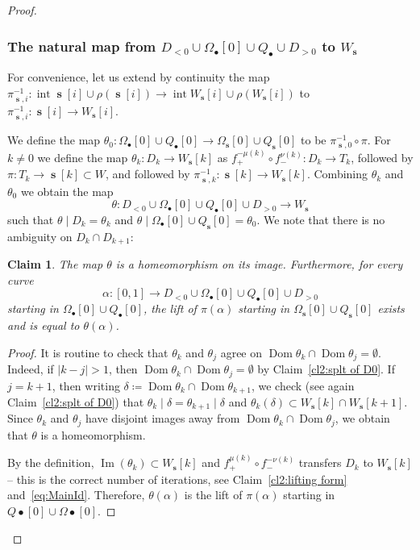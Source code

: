 \documentclass[]{amsart}
\newcommand{\Dom}{\operatorname {Dom}}
\renewcommand{\Im}{\operatorname {Im}}
\newcommand\intr{\operatorname{int}}
\newcommand\seq{{\operatorname{\mathbf s}}}
\newcommand\oseq{{\bullet}}
\newcommand\wall{{Q}}
\newcommand\inn{{\Omega}}
\newtheorem{claim2}{Claim}
\theoremstyle{remark}
\numberwithin{equation}{section}
\theoremstyle{definition}
\begin{document}
\begin{proof}
\subsubsection{The natural map from $D_{<0}\cup \inn_{\oseq }[0]\cup \wall_{\oseq }  \cup D_{>0}$ to $W_\seq$}For convenience, let us extend by continuity the map $\pi^{-1}_{\seq,i}\colon \intr \seq[i]\cup \rho(\seq[i]) \to \intr W_{\seq}[i] \cup \rho(W_\seq[i])$ to $\pi^{-1}_{\seq,i}\colon  \seq[i] \to  W_{\seq}[i]$.  

We define the map $\theta_0\colon \inn_{\oseq }[0]\cup \wall_{\oseq }[0]\to \inn_\seq[0]\cup \wall_\seq[0]$ to be $\pi^{-1}_{\seq,0}\circ \pi$. For $k\not=0$ we define the map $\theta_k\colon D_k\to W_\seq[k]$ as $ f_{+}^ {-\mu(k)}\circ   f_{-}^ {\nu(k)}\colon D_k\to T_k$, followed by ${\pi\colon T_k\to \seq[k]\subset W}$, and followed by $\pi^{-1}_{\seq, k}\colon \seq[k]\to W_\seq[k]$.   Combining $\theta_k$ and $\theta_0$ we obtain the map  \[\theta \colon D_{<0}\cup \inn_{\oseq }[0]\cup \wall_{\oseq }[0]  \cup D_{>0}\to W_\seq\] such that $\theta\mid D_k=\theta_k$ and $\theta\mid \inn_\oseq[0] \cup \wall_\seq [0]=\theta _0$. We note that there is no ambiguity on $D_{k}\cap D_{k+1}$:

\begin{claim2}
\label{cl2: nat map}
The map $\theta$ is a homeomorphism on its image. Furthermore, for every curve \[\alpha \colon [0,1]\to D_{<0}\cup \inn_{\oseq }[0]\cup \wall_{\oseq }[0]  \cup D_{>0}\] starting in $ \inn_{\oseq }[0]\cup \wall_{\oseq }[0]$, the lift of  $\pi(\alpha)$ starting in $\inn_{\seq}[0]\cup \wall_{\seq}[0]$ exists and is equal to $\theta(\alpha)$.
\end{claim2}
\begin{proof}
It is routine to check that $\theta_k$ and $ \theta_j$ agree on $\Dom \theta_k \cap\Dom \theta_{j} =\emptyset$. Indeed, if $|k-j|>1$, then $\Dom \theta_k \cap\Dom \theta_{j} =\emptyset$ by Claim~\ref{cl2:splt of D0}. If $j=k+1$, then writing $\delta\coloneqq \Dom \theta_k \cap\Dom \theta_{k+1}$, we check (see again Claim~\ref{cl2:splt of D0}) that $\theta_k\mid \delta =\theta_{k+1}\mid \delta$ and $\theta_k(\delta)\subset W_\seq[k]\cap W_\seq[k+1]$. Since  $\theta_k$ and $ \theta_j$  have disjoint images away from $\Dom \theta_k \cap\Dom \theta_{j}$, we obtain that $\theta$ is a homeomorphism.


By the definition, $\Im(\theta_k)\subset W_\seq[k]$ and $f_{+}^ {\mu(k)}\circ   f_{-}^ {-\nu(k)}$ transfers $D_k$ to $W_\seq[k]$ -- this is  the correct number of iterations, see Claim~\ref{cl2:lifting form} and~\eqref{eq:MainId}. Therefore, $\theta(\alpha)$ is the lift of $\pi(\alpha)$ starting in $\wall\oseq[0]\cup\inn\oseq[0]$.




\end{proof}
\end{proof}
\end{document}
